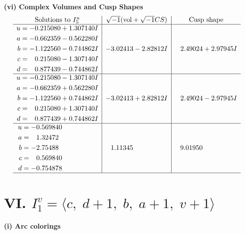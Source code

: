 \documentclass[1p]{elsarticle_modified}
\theoremstyle{definition}
\newcommand{\I}{\sqrt{-1}}
\begin{document}
\newpage\flushleft \textbf{(vi) Complex Volumes and Cusp Shapes}
$$\begin{array}{c|c|c}  
\text{Solutions to }I^u_{5}& \I (\text{vol} + \sqrt{-1}CS) & \text{Cusp shape}\\
 \hline 
\begin{aligned}
u &= -0.215080 + 1.307140 I \\
a &= -0.662359 - 0.562280 I \\
b &= -1.122560 - 0.744862 I \\
c &= \phantom{-}0.215080 - 1.307140 I \\
d &= \phantom{-}0.877439 - 0.744862 I\end{aligned}
 & -3.02413 - 2.82812 I & \phantom{-}2.49024 + 2.97945 I \\ \hline\begin{aligned}
u &= -0.215080 - 1.307140 I \\
a &= -0.662359 + 0.562280 I \\
b &= -1.122560 + 0.744862 I \\
c &= \phantom{-}0.215080 + 1.307140 I \\
d &= \phantom{-}0.877439 + 0.744862 I\end{aligned}
 & -3.02413 + 2.82812 I & \phantom{-}2.49024 - 2.97945 I \\ \hline\begin{aligned}
u &= -0.569840\phantom{ +0.000000I} \\
a &= \phantom{-}1.32472\phantom{ +0.000000I} \\
b &= -2.75488\phantom{ +0.000000I} \\
c &= \phantom{-}0.569840\phantom{ +0.000000I} \\
d &= -0.754878\phantom{ +0.000000I}\end{aligned}
 & \phantom{-}1.11345\phantom{ +0.000000I} & \phantom{-}9.01950\phantom{ +0.000000I}\\
 \hline 
 \end{array}$$\newpage\newpage\renewcommand{\arraystretch}{1}
\centering \section*{VI. $I^v_{1}= \langle c,\;d+1,\;b,\;a+1,\;v+1 \rangle$}
\flushleft \textbf{(i) Arc colorings}\\
\end{document}
